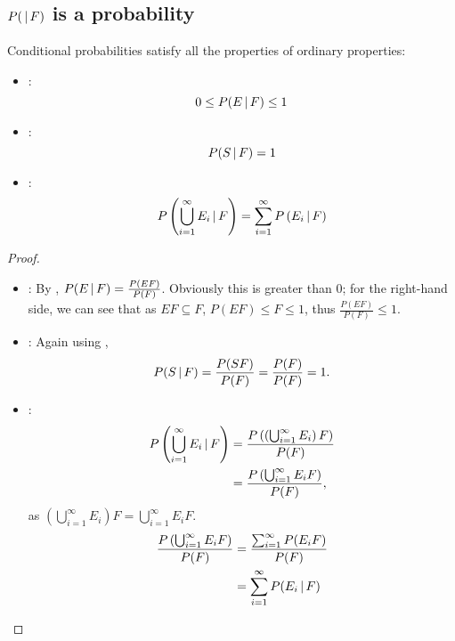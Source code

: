 \subsection{\texorpdfstring{$P(\,\vert\, F)$ is a probability}{P(|F) is a probability}}
\begin{proposition}
    Conditional probabilities satisfy all the properties of ordinary properties: \begin{itemize}
        \item {}: \[
            0 \leq P(E \,\vert\, F) \leq 1    
        \]
        \item {}: \[
            P(S \,\vert\, F) = 1    
        \]
        \item {}: \[
            P\left( \bigcup^\infty_{i = 1} E_i \,\vert\, F \right) = \sum^\infty_{i = 1} P\left( E_i \,\vert\, F \right)
        \]
    \end{itemize}
\end{proposition}
\begin{proof}\hfill
    \begin{itemize}
        \item {}: By , $P(E \,\vert\, F) = \frac{P(EF)}{P(F)}$. Obviously this is greater than $0$; for the right-hand side, we can see that as $EF \subseteq F$, $P(EF) \leq F \leq 1$, thus $\frac{P(EF)}{P(F)} \leq 1$.
        \item {}: Again using , \[
            P(S \,\vert\, F) = \frac{P(SF)}{P(F)} = \frac{P(F)}{P(F)} = 1.    
        \]
        \item {}: \[
            \begin{aligned}
                P\left( \bigcup^\infty_{i = 1} E_i \,\vert\, F \right) &= \frac{P\left( \left( \bigcup^\infty_{i = 1} E_i \right) F \right)}{P(F)} \\
                &= \frac{P\left( \bigcup^\infty_{i = 1} E_iF \right)}{P(F)},
            \end{aligned}
        \]as $\left( \bigcup^\infty_{i = 1} E_i \right)F = \bigcup^\infty_{i = 1} E_iF$. \[
            \begin{aligned}
                \frac{P\left( \bigcup^\infty_{i = 1} E_iF \right)}{P(F)} &= \frac{\sum^\infty_{i = 1} P(E_iF)}{P(F)} \\
                &= \sum^\infty_{i = 1} P(E_i \,\vert\, F)
            \end{aligned}
        \]
    \end{itemize}
\end{proof}
